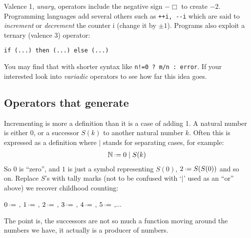 Valence 1, \emph{unary}, operators include the negative sign $-\Box$ to create 
$-2$.  Programming languages add several others 
such as \lstinline{++i, --i} which are said to \emph{increment} 
or \emph{decrement} the counter i (change it by $\pm 1$).
Programs also exploit a ternary (valence 3) operator:
\begin{center}
    \lstinline[language=Sava]{if (...) then (...) else (...)}
\end{center}
You may find that with shorter syntax like 
\lstinline{n!=0 ? m/n : error}.
If your interested look into \emph{variadic} operators to see how 
far this idea goes.

\subsection{Operators that generate}
Incrementing is more a definition than it is a 
 case of adding 1.
A natural number is either $0$, or a successor 
$S(k)$ to 
another natural number $k$.  Often this is expressed as a 
definition where $\mid$ stands for separating cases, 
for example:
\begin{align*}
    \mathbb{N} \defeq 0 \mid S(k)
\end{align*}
So $0$ is ``zero'', and $1$ is just a symbol representing $S(0)$, 
$2\defeq S(S(0))$ and so on.  Replace $S$'s with tally marks (not to be 
confused with `$|$' used as an ``or'' above)
we recover childhood counting:
\begin{center}
    $0\defeq$ \underline{\hspace{5mm}}, 
    $1\defeq$ \StrokeOne,
    $2\defeq$ \StrokeTwo,
    $3\defeq$ \StrokeThree,
    $4\defeq$ \StrokeFour,
    $5\defeq$ \StrokeFive,...
\end{center}
The point is, the successors are not so much a function 
moving around the numbers we have, it actually is a producer 
of numbers. 

